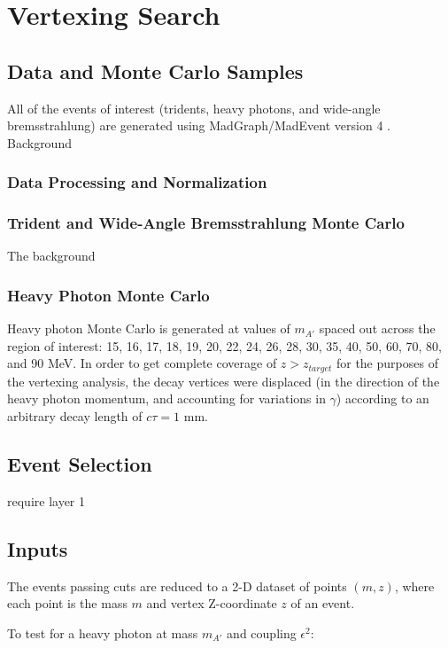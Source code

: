 \chapter{Vertexing Search}

\section{Data and Monte Carlo Samples}
All of the events of interest (tridents, heavy photons, and wide-angle bremsstrahlung) are generated using MadGraph/MadEvent version 4 \cite{alwall_madgraph/madevent_2007}.
Background

\subsection{Data Processing and Normalization}

\subsection{Trident and Wide-Angle Bremsstrahlung Monte Carlo}
The background 

\subsection{Heavy Photon Monte Carlo}
\label{sec:ap_mc}
Heavy photon Monte Carlo is generated at values of $m_{A'}$ spaced out across the region of interest: 15, 16, 17, 18, 19, 20, 22, 24, 26, 28, 30, 35, 40, 50, 60, 70, 80, and 90 MeV.
In order to get complete coverage of $z>z_{target}$ for the purposes of the vertexing analysis, the decay vertices were displaced (in the direction of the heavy photon momentum, and accounting for variations in $\gamma$) according to an arbitrary decay length of $c\tau=1$ mm.

\section{Event Selection}
require layer 1

\section{Inputs}
The events passing cuts are reduced to a 2-D dataset of points $(m,z)$, where each point is the mass $m$ and vertex Z-coordinate $z$ of an event.




To test for a heavy photon at mass $m_{A'}$ and coupling $\epsilon^2$:

